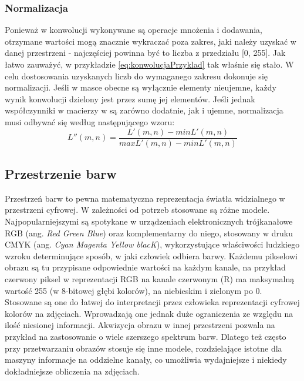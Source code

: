 \subsubsection{Normalizacja}
Ponieważ w konwolucji wykonywane są operacje mnożenia i dodawania, otrzymane wartości mogą znacznie wykraczać poza zakres, jaki należy uzyskać w danej przestrzeni - najczęściej powinna być to liczba z przedziału [0, 255]. Jak łatwo zauważyć, w przykładzie \ref{eq:konwolucjaPrzyklad} tak właśnie się stało. W celu dostosowania uzyskanych liczb do wymaganego zakresu dokonuje się normalizacji. Jeśli w masce obecne są wyłącznie elementy nieujemne, każdy wynik konwolucji dzielony jest przez sumę jej elementów. Jeśli jednak współczynniki w macierzy w są zarówno dodatnie, jak i ujemne, normalizacja musi odbywać się według następującego wzoru:
\begin{equation}
L''(m,n) = \dfrac{L'(m,n)-minL'(m,n)}{maxL'(m,n)-minL'(m,n)}
\end{equation}
\subsection{Przestrzenie barw}
Przestrzeń barw to pewna matematyczna reprezentacja światła widzialnego w przestrzeni cyfrowej. W zależności od potrzeb stosowane są różne modele. Najpopularniejszymi są spotykane w urządzeniach elektronicznych trójkanałowe RGB (ang. \textit{Red Green Blue}) oraz komplementarny do niego, stosowany w druku CMYK (ang. \textit{Cyan Magenta Yellow blacK}), wykorzystujące właściwości ludzkiego wzroku determinujące sposób, w jaki człowiek odbiera barwy. Każdemu pikselowi obrazu są tu przypisane odpowiednie wartości na każdym kanale, na przykład czerwony piksel w reprezentacji RGB na kanale czerwonym (R) ma maksymalną wartość 255 (w 8-bitowej głębi kolorów), na niebieskim i zielonym po 0. Stosowane są one do łatwej do interpretacji przez człowieka reprezentacji cyfrowej kolorów na zdjęciach. Wprowadzają one jednak duże ograniczenia ze względu na ilość niesionej informacji. Akwizycja obrazu w innej przestrzeni pozwala na przykład na zastosowanie o wiele szerszego spektrum barw. Dlatego też często przy przetwarzaniu obrazów stosuje się inne modele, rozdzielające istotne dla maszyny informacje na oddzielne kanały, co umożliwia wydajniejsze i niekiedy dokładniejsze obliczenia na zdjęciach.
